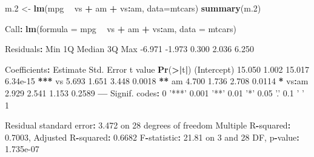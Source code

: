 \documentclass[]{article}
\newenvironment{Shaded}{\begin{snugshade}}{\end{snugshade}}
\newcommand{\DataTypeTok}[1]{\textcolor[rgb]{0.13,0.29,0.53}{#1}}
\newcommand{\DecValTok}[1]{\textcolor[rgb]{0.00,0.00,0.81}{#1}}
\newcommand{\ErrorTok}[1]{\textcolor[rgb]{0.64,0.00,0.00}{\textbf{#1}}}
\newcommand{\FloatTok}[1]{\textcolor[rgb]{0.00,0.00,0.81}{#1}}
\newcommand{\KeywordTok}[1]{\textcolor[rgb]{0.13,0.29,0.53}{\textbf{#1}}}
\newcommand{\NormalTok}[1]{#1}
\newcommand{\OperatorTok}[1]{\textcolor[rgb]{0.81,0.36,0.00}{\textbf{#1}}}
\newcommand{\StringTok}[1]{\textcolor[rgb]{0.31,0.60,0.02}{#1}}
\begin{document}
\begin{Shaded}
\begin{Highlighting}[]
\NormalTok{m}\FloatTok{.2}\NormalTok{ <-}\StringTok{ }\KeywordTok{lm}\NormalTok{(mpg }\OperatorTok{~}\StringTok{ }\NormalTok{vs }\OperatorTok{+}\StringTok{ }\NormalTok{am }\OperatorTok{+}\StringTok{ }\NormalTok{vs}\OperatorTok{:}\NormalTok{am, }\DataTypeTok{data=}\NormalTok{mtcars)}
\KeywordTok{summary}\NormalTok{(m}\FloatTok{.2}\NormalTok{)}

\NormalTok{Call}\OperatorTok{:}
\KeywordTok{lm}\NormalTok{(}\DataTypeTok{formula =}\NormalTok{ mpg }\OperatorTok{~}\StringTok{ }\NormalTok{vs }\OperatorTok{+}\StringTok{ }\NormalTok{am }\OperatorTok{+}\StringTok{ }\NormalTok{vs}\OperatorTok{:}\NormalTok{am, }\DataTypeTok{data =}\NormalTok{ mtcars)}

\NormalTok{Residuals}\OperatorTok{:}
\StringTok{   }\NormalTok{Min     1Q Median     3Q    Max }
\FloatTok{-6.971} \FloatTok{-1.973}  \FloatTok{0.300}  \FloatTok{2.036}  \FloatTok{6.250} 

\NormalTok{Coefficients}\OperatorTok{:}
\StringTok{            }\NormalTok{Estimate Std. Error t value }\KeywordTok{Pr}\NormalTok{(}\OperatorTok{>}\ErrorTok{|}\NormalTok{t}\OperatorTok{|}\NormalTok{)    }
\NormalTok{(Intercept)   }\FloatTok{15.050}      \FloatTok{1.002}  \FloatTok{15.017} \FloatTok{6.34e-15} \OperatorTok{**}\ErrorTok{*}
\NormalTok{vs             }\FloatTok{5.693}      \FloatTok{1.651}   \FloatTok{3.448}   \FloatTok{0.0018} \OperatorTok{**}\StringTok{ }
\NormalTok{am             }\FloatTok{4.700}      \FloatTok{1.736}   \FloatTok{2.708}   \FloatTok{0.0114} \OperatorTok{*}\StringTok{  }
\NormalTok{vs}\OperatorTok{:}\NormalTok{am          }\FloatTok{2.929}      \FloatTok{2.541}   \FloatTok{1.153}   \FloatTok{0.2589}    
\OperatorTok{---}
\NormalTok{Signif. codes}\OperatorTok{:}\StringTok{  }\DecValTok{0} \StringTok{'***'} \FloatTok{0.001} \StringTok{'**'} \FloatTok{0.01} \StringTok{'*'} \FloatTok{0.05} \StringTok{'.'} \FloatTok{0.1} \StringTok{' '} \DecValTok{1}

\NormalTok{Residual standard error}\OperatorTok{:}\StringTok{ }\FloatTok{3.472}\NormalTok{ on }\DecValTok{28}\NormalTok{ degrees of freedom}
\NormalTok{Multiple R}\OperatorTok{-}\NormalTok{squared}\OperatorTok{:}\StringTok{  }\FloatTok{0.7003}\NormalTok{,    Adjusted R}\OperatorTok{-}\NormalTok{squared}\OperatorTok{:}\StringTok{  }\FloatTok{0.6682} 
\NormalTok{F}\OperatorTok{-}\NormalTok{statistic}\OperatorTok{:}\StringTok{ }\FloatTok{21.81}\NormalTok{ on }\DecValTok{3}\NormalTok{ and }\DecValTok{28}\NormalTok{ DF,  p}\OperatorTok{-}\NormalTok{value}\OperatorTok{:}\StringTok{ }\FloatTok{1.735e-07}
\end{Highlighting}
\end{Shaded}
\end{document}
